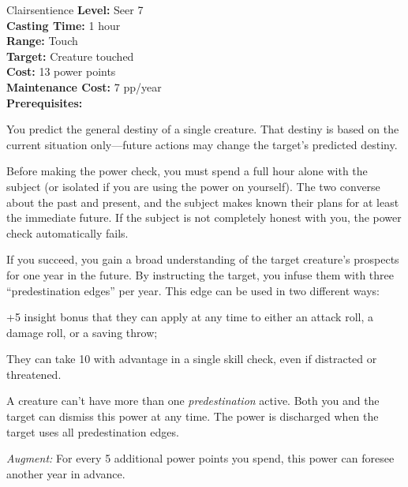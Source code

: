 {Clairsentience}
{
	\textbf{Level:}
	Seer 7\\
	\textbf{Casting Time:}
	1 hour\\
	\textbf{Range:}
	Touch\\
	\textbf{Target:}
	Creature touched\\
	\textbf{Cost:}
	13 power points\\
	\textbf{Maintenance Cost:}
	7 pp/year\\
	\textbf{Prerequisites:}
	\\
}
{
	You predict the general destiny of a single creature. That destiny is based on the current situation only---future actions may change the target's predicted destiny.

	Before making the power check, you must spend a full hour alone with the subject (or isolated if you are using the power on yourself). The two converse about the past and present, and the subject makes known their plans for at least the immediate future. If the subject is not completely honest with you, the power check automatically fails.

	If you succeed, you gain a broad understanding of the target creature's prospects for one year in the future. By instructing the target, you infuse them with three ``predestination edges'' per year. This edge can be used in two different ways:
	\begin{enumerate*}
	\item +5 insight bonus that they can apply at any time to either an attack roll, a damage roll, or a saving throw;
	\item They can take 10 with advantage in a single skill check, even if distracted or threatened.
	\end{enumerate*}

	A creature can't have more than one \emph{predestination} active. Both you and the target can dismiss this power at any time. The power is discharged when the target uses all predestination edges.

	\textit{Augment:} For every 5 additional power points you spend, this power can foresee another year in advance.
}